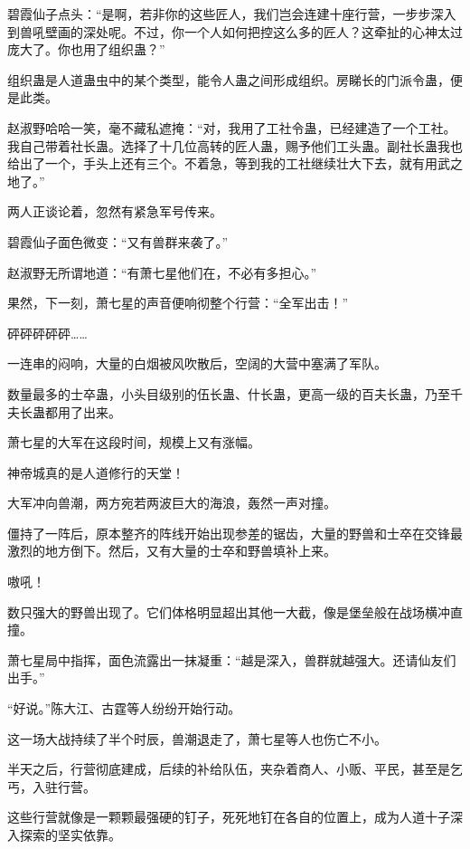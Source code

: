 \begin{this_body}
碧霞仙子点头：“是啊，若非你的这些匠人，我们岂会连建十座行营，一步步深入到兽吼壁画的深处呢。不过，你一个人如何把控这么多的匠人？这牵扯的心神太过庞大了。你也用了组织蛊？”

组织蛊是人道蛊虫中的某个类型，能令人蛊之间形成组织。房睇长的门派令蛊，便是此类。

赵淑野哈哈一笑，毫不藏私遮掩：“对，我用了工社令蛊，已经建造了一个工社。我自己带着社长蛊。选择了十几位高转的匠人蛊，赐予他们工头蛊。副社长蛊我也给出了一个，手头上还有三个。不着急，等到我的工社继续壮大下去，就有用武之地了。”

两人正谈论着，忽然有紧急军号传来。

碧霞仙子面色微变：“又有兽群来袭了。”

赵淑野无所谓地道：“有萧七星他们在，不必有多担心。”

果然，下一刻，萧七星的声音便响彻整个行营：“全军出击！”

砰砰砰砰砰……

一连串的闷响，大量的白烟被风吹散后，空阔的大营中塞满了军队。

数量最多的士卒蛊，小头目级别的伍长蛊、什长蛊，更高一级的百夫长蛊，乃至千夫长蛊都用了出来。

萧七星的大军在这段时间，规模上又有涨幅。

神帝城真的是人道修行的天堂！

大军冲向兽潮，两方宛若两波巨大的海浪，轰然一声对撞。

僵持了一阵后，原本整齐的阵线开始出现参差的锯齿，大量的野兽和士卒在交锋最激烈的地方倒下。然后，又有大量的士卒和野兽填补上来。

嗷吼！

数只强大的野兽出现了。它们体格明显超出其他一大截，像是堡垒般在战场横冲直撞。

萧七星局中指挥，面色流露出一抹凝重：“越是深入，兽群就越强大。还请仙友们出手。”

“好说。”陈大江、古霆等人纷纷开始行动。

这一场大战持续了半个时辰，兽潮退走了，萧七星等人也伤亡不小。

半天之后，行营彻底建成，后续的补给队伍，夹杂着商人、小贩、平民，甚至是乞丐，入驻行营。

这些行营就像是一颗颗最强硬的钉子，死死地钉在各自的位置上，成为人道十子深入探索的坚实依靠。

\end{this_body}


